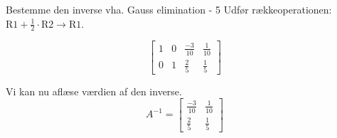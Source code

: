 \documentclass{article}
\begin{document}
\begin{exercise}{Bestemme den inverse vha. Gauss elimination - 5}
	\hint
	Udfør rækkeoperationen: $\text{R1} + \frac{1}{2} \cdot \text{R2} \to \text{R1}$.
	
	\hint
	\[
	\left[\begin{array}{cc|cc}
	1 & 0 & \frac{-3}{10} & \frac{1}{10} \\ 
	0 & 1 & \frac{2}{5} & \frac{1}{5}
	\end{array} \right]
	\]
	
	\hint
	Vi kan nu aflæse værdien af den inverse.
	\[
	A^{-1} = \left[\begin{array}{cc}
	\frac{-3}{10} & \frac{1}{10} \\ 
	\frac{2}{5} & \frac{1}{5}
	\end{array} \right]
	\]
	
	
\end{exercise}
\end{document}
